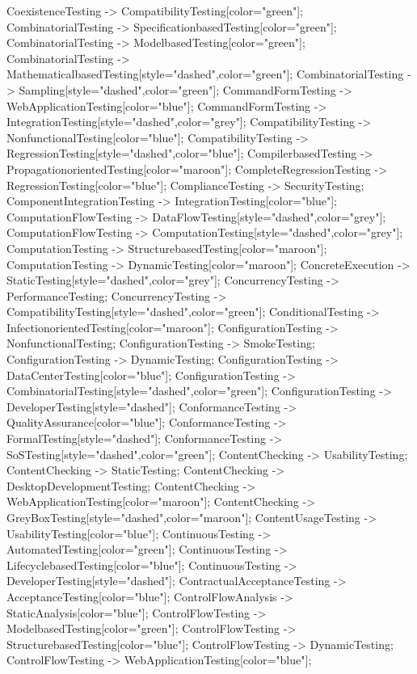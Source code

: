 \documentclass{article}
\begin{document}
{CoexistenceTesting -> CompatibilityTesting[color="green"];
CombinatorialTesting -> SpecificationbasedTesting[color="green"];
CombinatorialTesting -> ModelbasedTesting[color="green"];
CombinatorialTesting -> MathematicalbasedTesting[style="dashed",color="green"];
CombinatorialTesting -> Sampling[style="dashed",color="green"];
CommandFormTesting -> WebApplicationTesting[color="blue"];
CommandFormTesting -> IntegrationTesting[style="dashed",color="grey"];
CompatibilityTesting -> NonfunctionalTesting[color="blue"];
CompatibilityTesting -> RegressionTesting[style="dashed",color="blue"];
CompilerbasedTesting -> PropagationorientedTesting[color="maroon"];
CompleteRegressionTesting -> RegressionTesting[color="blue"];
ComplianceTesting -> SecurityTesting;
ComponentIntegrationTesting -> IntegrationTesting[color="blue"];
ComputationFlowTesting -> DataFlowTesting[style="dashed",color="grey"];
ComputationFlowTesting -> ComputationTesting[style="dashed",color="grey"];
ComputationTesting -> StructurebasedTesting[color="maroon"];
ComputationTesting -> DynamicTesting[color="maroon"];
ConcreteExecution -> StaticTesting[style="dashed",color="grey"];
ConcurrencyTesting -> PerformanceTesting;
ConcurrencyTesting -> CompatibilityTesting[style="dashed",color="green"];
ConditionalTesting -> InfectionorientedTesting[color="maroon"];
ConfigurationTesting -> NonfunctionalTesting;
ConfigurationTesting -> SmokeTesting;
ConfigurationTesting -> DynamicTesting;
ConfigurationTesting -> DataCenterTesting[color="blue"];
ConfigurationTesting -> CombinatorialTesting[style="dashed",color="green"];
ConfigurationTesting -> DeveloperTesting[style="dashed"];
ConformanceTesting -> QualityAssurance[color="blue"];
ConformanceTesting -> FormalTesting[style="dashed"];
ConformanceTesting -> SoSTesting[style="dashed",color="green"];
ContentChecking -> UsabilityTesting;
ContentChecking -> StaticTesting;
ContentChecking -> DesktopDevelopmentTesting;
ContentChecking -> WebApplicationTesting[color="maroon"];
ContentChecking -> GreyBoxTesting[style="dashed",color="maroon"];
ContentUsageTesting -> UsabilityTesting[color="blue"];
ContinuousTesting -> AutomatedTesting[color="green"];
ContinuousTesting -> LifecyclebasedTesting[color="blue"];
ContinuousTesting -> DeveloperTesting[style="dashed"];
ContractualAcceptanceTesting -> AcceptanceTesting[color="blue"];
ControlFlowAnalysis -> StaticAnalysis[color="blue"];
ControlFlowTesting -> ModelbasedTesting[color="green"];
ControlFlowTesting -> StructurebasedTesting[color="blue"];
ControlFlowTesting -> DynamicTesting;
ControlFlowTesting -> WebApplicationTesting[color="blue"];
}
\end{document}
